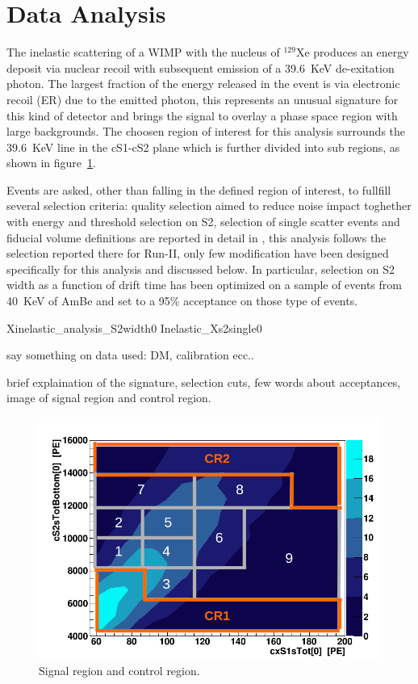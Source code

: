 \section{Data Analysis}

The inelastic scattering of a WIMP with the nucleus of $^{129}$Xe produces an energy deposit via nuclear recoil with subsequent emission of  
a 39.6~KeV de-exitation photon. 
The largest fraction of the energy released in the event is via electronic recoil (ER) due to the emitted photon, this represents an
unusual signature for this kind of detector and brings the signal to overlay a phase space region with large backgrounds.
The choosen region of interest for this analysis surrounds the 39.6~KeV line in the cS1-cS2 plane which is further divided into
sub regions, as shown in figure~\ref{fig:SR}.

Events are asked, other than falling in the defined region of interest, to fullfill several selection criteria:
quality selection aimed to reduce noise impact toghether with energy and threshold selection on S2,
selection of single scatter events and fiducial volume definitions are reported in detail in \cite{dataAnalysis}, this analysis follows
the selection reported there for Run-II, only few modification have been designed specifically for this analysis and discussed below. 
In particular, selection on S2 width as a function of drift time has been optimized on a sample of events from 40~KeV of AmBe 
and set to a 95\% acceptance on those type of events.  

Xinelastic\_analysis\_S2width0
Inelastic\_Xs2single0

say something on data used: DM, calibration ecc..

brief explaination of the signature, selection cuts, few words about acceptances, image of signal region and control region.

\begin{figure}[h]
  \includegraphics[width=\linewidth]{images/bkg_in_sr.png}
  \caption{Signal region and control region.}
  \label{fig:SR}
\end{figure}

